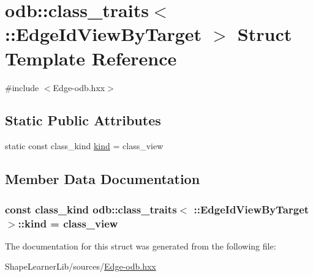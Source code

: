\hypertarget{structodb_1_1class__traits_3_01_1_1_edge_id_view_by_target_01_4}{}\section{odb\+:\+:class\+\_\+traits$<$ \+:\+:Edge\+Id\+View\+By\+Target $>$ Struct Template Reference}
\label{structodb_1_1class__traits_3_01_1_1_edge_id_view_by_target_01_4}


{\ttfamily \#include $<$Edge-\/odb.\+hxx$>$}

\subsection*{Static Public Attributes}
\begin{DoxyCompactItemize}
\item 
static const class\+\_\+kind \hyperlink{structodb_1_1class__traits_3_01_1_1_edge_id_view_by_target_01_4_a9526f63c53bb5597b62a5d384bd243b5}{kind} = class\+\_\+view
\end{DoxyCompactItemize}


\subsection{Member Data Documentation}
\hypertarget{structodb_1_1class__traits_3_01_1_1_edge_id_view_by_target_01_4_a9526f63c53bb5597b62a5d384bd243b5}{}
\subsubsection[{kind}]{\setlength{\rightskip}{0pt plus 5cm}const class\+\_\+kind odb\+::class\+\_\+traits$<$ \+::{\bf Edge\+Id\+View\+By\+Target} $>$\+::kind = class\+\_\+view\hspace{0.3cm}{\ttfamily [static]}}\label{structodb_1_1class__traits_3_01_1_1_edge_id_view_by_target_01_4_a9526f63c53bb5597b62a5d384bd243b5}


The documentation for this struct was generated from the following file\+:\begin{DoxyCompactItemize}
\item 
Shape\+Learner\+Lib/sources/\hyperlink{_edge-odb_8hxx}{Edge-\/odb.\+hxx}\end{DoxyCompactItemize}
